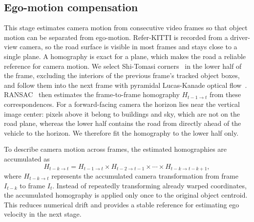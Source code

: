 \documentclass{article}
\begin{document}
\subsection{Ego-motion compensation}
\label{sec:ego}
This stage estimates camera motion from consecutive video frames so that object motion can be separated from ego-motion. Refer-KITTI is recorded from a driver-view camera, so the road surface is visible in most frames and stays close to a single plane. A homography is exact for a plane, which makes the road a reliable reference for camera motion. We select Shi-Tomasi corners~\cite{shitomasi} in the lower half of the frame, excluding the interiors of the previous frame's tracked object boxes, and follow them into the next frame with pyramidal Lucas-Kanade optical flow~\cite{lucaskanade}. RANSAC~\cite{ransac} then estimates the frame-to-frame homography $H_{t-1 \to t}$ from these correspondences. For a forward-facing camera the horizon lies near the vertical image center: pixels above it belong to buildings and sky, which are not on the road plane, whereas the lower half contains the road from directly ahead of the vehicle to the horizon. We therefore fit the homography to the lower half only.

To describe camera motion across frames, the estimated homographies are accumulated as
\begin{equation}
  H_{t-k \to t} = H_{t-1 \to t} \times H_{t-2 \to t-1} \times \cdots \times H_{t-k \to t-k+1},
  \label{eq:cumulative}
\end{equation}
where $H_{t-k \to t}$ represents the accumulated camera transformation from frame $I_{t-k}$ to frame $I_t$. Instead of repeatedly transforming already warped coordinates, the accumulated homography is applied only once to the original object centroid. This reduces numerical drift and provides a stable reference for estimating ego velocity in the next stage.
\end{document}
